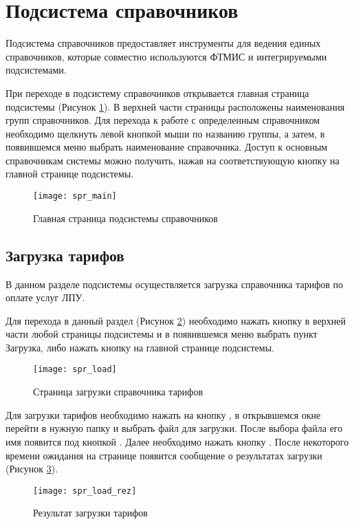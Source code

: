 \newpage
\section{Подсистема справочников}

Подсистема справочников предоставляет инструменты для ведения единых справочников, которые совместно используются  ФТМИС и интегрируемыми подсистемами.

При переходе в подсистему справочников открывается главная страница подсистемы (Рисунок \ref{img_spr_main}). В верхней части страницы расположены наименования групп справочников. Для перехода к работе с определенным справочником необходимо щелкнуть левой кнопкой мыши по названию группы, а затем, в появившемся меню выбрать наименование справочника. Доступ к основным справочникам системы можно получить, нажав на соответствующую кнопку на главной странице подсистемы.

\begin{figure}[ht]\centering
 \texttt{[image: spr\_main]}
 \caption{Главная страница подсистемы справочников}
 \label{img_spr_main}
\end{figure}

\subsection{Загрузка тарифов}

В данном разделе подсистемы осуществляется загрузка справочника тарифов по оплате услуг ЛПУ.

Для перехода в данный раздел (Рисунок \ref{img_spr_load}) необходимо нажать кнопку   в верхней части любой страницы подсистемы и в появившемся меню выбрать пункт Загрузка, либо нажать кнопку  на главной странице подсистемы.

\begin{figure}[ht]\centering
 \texttt{[image: spr\_load]}
 \caption{Страница загрузки справочника тарифов}
 \label{img_spr_load}
\end{figure}

Для загрузки тарифов необходимо нажать на кнопку , в открывшемся окне перейти в нужную папку и выбрать файл для загрузки. После выбора файла его имя появится под кнопкой . Далее необходимо нажать кнопку  . После некоторого времени ожидания на странице появится сообщение о результатах загрузки (Рисунок \ref{img_spr_load_rez}).

\begin{figure}[ht]\centering
 \texttt{[image: spr\_load\_rez]}
 \caption{Результат загрузки тарифов}
 \label{img_spr_load_rez}
\end{figure}